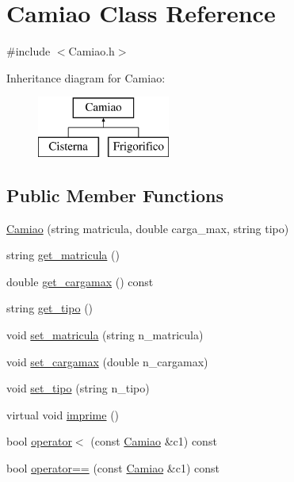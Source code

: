 \hypertarget{class_camiao}{
\section{Camiao Class Reference}
\label{class_camiao}
}


{\ttfamily \#include $<$Camiao.h$>$}

Inheritance diagram for Camiao:\begin{figure}[H]
\begin{center}
\leavevmode
\includegraphics[height=2.000000cm]{class_camiao}
\end{center}
\end{figure}
\subsection*{Public Member Functions}
\begin{DoxyCompactItemize}
\item 
\hyperlink{class_camiao_a703250cf1ed466e114daeedd9b99a575}{Camiao} (string matricula, double carga\_\-max, string tipo)
\item 
string \hyperlink{class_camiao_ac8ce75e1ed7ab909a8edb2538fb75521}{get\_\-matricula} ()
\item 
double \hyperlink{class_camiao_aee81c75cec67a1ca07f9c34587d820f2}{get\_\-cargamax} () const 
\item 
string \hyperlink{class_camiao_aed19df1b5489531e48d6ecc7e70fdb24}{get\_\-tipo} ()
\item 
void \hyperlink{class_camiao_a55364a84597d14ed3f870b73ee2449cb}{set\_\-matricula} (string n\_\-matricula)
\item 
void \hyperlink{class_camiao_a74764db25ab13501352f0a753e27161d}{set\_\-cargamax} (double n\_\-cargamax)
\item 
void \hyperlink{class_camiao_af86ac4cad261ca9088b924eaa52a7c78}{set\_\-tipo} (string n\_\-tipo)
\item 
virtual void \hyperlink{class_camiao_aa19eade3bd6c53d6d1bb8ae3641777c0}{imprime} ()
\item 
bool \hyperlink{class_camiao_af1b65a2f23a4a52cf1459f28055b6928}{operator$<$} (const \hyperlink{class_camiao}{Camiao} \&c1) const 
\item 
bool \hyperlink{class_camiao_accdafce5722c49b7ec755f8ed2289f87}{operator==} (const \hyperlink{class_camiao}{Camiao} \&c1) const 
\end{DoxyCompactItemize}


